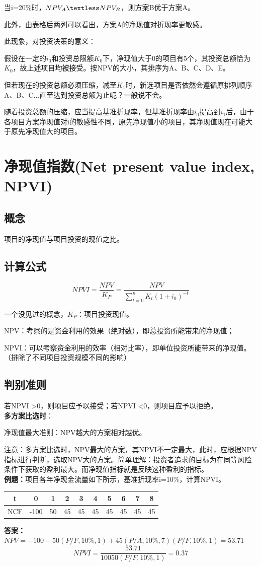 当i=20\%时，$NPV_A \textless NPV_B$，则方案B优于方案A。

此外，由表格后两列可以看出，方案A的净现值对折现率更敏感。

此现象，对投资决策的意义：

假设在一定的$i_0$和投资总限额$K_0$下，净现值大于0的项目有5个，其投资总额恰为$K_0$，故上述项目均被接受。按NPV的大小，其排序为A、B、C、D、E。

但若现在的投资总额必须压缩，减至$K_1$时，新选项目是否依然会遵循原排列顺序A、B、C...直至达到投资总额为止呢？一般说不会。

随着投资总额的压缩，应当提高基准折现率，但基准折现率由$i_0$提高到$i_1$后，由于各项目方案净现值对i的敏感性不同，原先净现值小的项目，其净现值现在可能大于原先净现值大的项目。

\section{净现值指数(Net present value index, NPVI)}
\subsection{概念}
项目的净现值与项目投资的现值之比。
\subsection{计算公式}
$$NPVI=\frac{NPV}{K_P}=\frac{NPV}{\sum_{t=0}^{n}K_t(1+i_0)^{-t}}$$

一个没见过的概念，$K_P$：项目投资现值。

NPV：考察的是资金利用的效果（绝对数），即总投资所能带来的净现值；

NPVI：可以考察资金利用的效率（相对比率），即单位投资所能带来的净现值。（排除了不同项目投资规模不同的影响）

\subsection{判别准则}

若NPVI \textgreater 0，则项目应予以接受；若NPVI \textless 0，则项目应予以拒绝。\\
\textbf{多方案比选时}：

净现值最大准则：NPV越大的方案相对越优。

注意：多方案比选时，NPV最大的方案，其NPVI不一定最大，此时，应根据NPV指标进行判断，选取NPV大的方案。简单理解：投资者追求的目标为在同等风险条件下获取的盈利最大。而净现值指标就是反映这种盈利的指标。\\
\textbf{例题：}项目各年净现金流量如下所示，基准折现率i=10\%，计算NPVI。
\begin{table}[H]
\centering
\begin{tabular}{|c|c|c|c|c|c|c|c|c|c|}
\hline
t   & 0 & 1 & 2 & 3 & 4  & 5  & 6  & 7   & 8      \\ \hline
NCF   & -100 & 50  & 45  & 45  & 45  & 45  & 45  & 45  & 45     \\ \hline
\end{tabular}
\end{table}
\textbf{答案：}$NPV =-100-50(P/F,10\%,1)+45(P/A,10\%,7)(P/F,10\%,1)=53.71$
$$NPVI=\frac{53.71}{100 50(P/F,10\%,1)}=0.37$$

